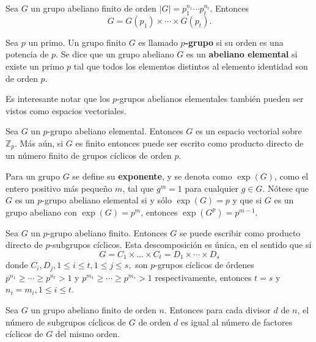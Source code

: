 \begin{lema}
Sea $G$ un grupo abeliano finito de orden $|G| = p_1^{n_1}\cdots p_t^{n_t}$. Entonces \[ G = G(p_1)\times \cdots \times G(p_t). \]
\end{lema}
\begin{definicion}
Sea $p$ un primo. Un grupo finito $G$ es llamado \textbf{$p$-grupo} si su orden es una potencia de $p$.
Se dice que un grupo abeliano $G$ es un \textbf{abeliano elemental} si existe un primo $p$ tal que todos los elementos distintos al elemento identidad son de orden $p$.
\end{definicion}
Es interesante notar que los $p$-grupos abelianos elementales también pueden ser vistos como espacios vectoriales.
\begin{lema}
Sea $G$ un $p$-grupo abeliano elemental. Entonces $G$ es un espacio vectorial sobre $\mathds{Z}_p$. Más aún, si $G$ es finito entonces puede ser escrito como producto directo de un número finito de grupos cíclicos de orden $p$.
\end{lema}
Para un grupo $G$ se define su \textbf{exponente}, y se denota como $\exp(G)$, como el entero positivo más pequeño $m$, tal que $g^m=1$ para cualquier $g \in G$. Nótese que $G$ es un $p$-grupo abeliano elemental si y sólo $\exp(G)=p$ y que si $G$ es un grupo abeliano con $\exp(G) = p^m$, entonces $\exp(G^p) = p^{m-1}$.
\begin{teorema}\label{teo:estructuraAbelianos}
Sea $G$ un $p$-grupo abeliano finito. Entonces $G$ se puede escribir como producto directo de $p$-subgrupos cíclicos. Esta descomposición es única, en el sentido que si
\[ G = C_1 \times \dots \times C_t = D_1 \times \cdots \times D_s \]
donde $C_i,D_j, 1\leq i \leq t, 1\leq j \leq s,$ son $p$-grupos cíclicos de órdenes $p^{n_1} \geq \cdots \geq p^{n_t}>1$ y $p^{m_1}\geq \cdots \geq p^{m_s}>1$ respectivamente, entonces $t=s$ y $n_i = m_i, 1\leq i \leq t$.
\end{teorema} 
\begin{proposicion}
Sea $G$ un grupo abeliano finito de orden $n$. Entonces para cada divisor $d$ de $n$, el número de subgrupos cíclicos de $G$ de orden $d$ es igual al número de factores cíclicos de $G$ del mismo orden.
\end{proposicion}

